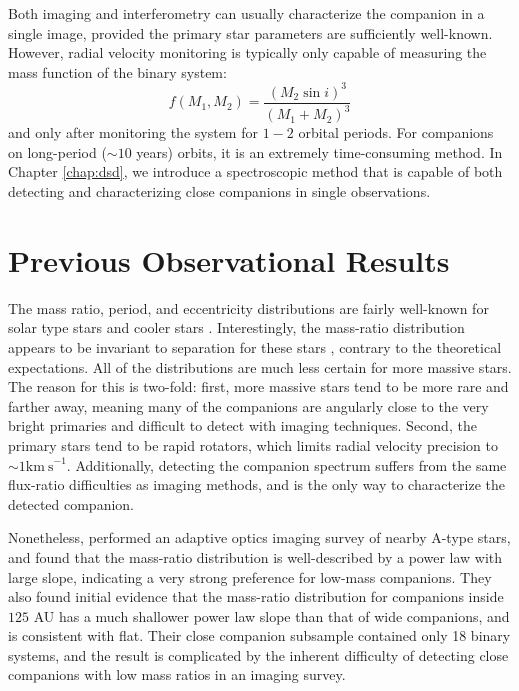 \documentclass{utthesis}
\begin{document}
Both imaging and interferometry can usually characterize the companion in a single image, provided the primary star parameters are sufficiently well-known. However, radial velocity monitoring is typically only capable of measuring the mass function of the binary system:
\begin{equation}
 f(M_1, M_2) = \frac{(M_2\sin{i})^3}{(M_1+M_2)^3}
 \end{equation}
 and only after monitoring the system for $1-2$ orbital periods. For companions on long-period ($\sim 10$ years) orbits, it is an extremely time-consuming method. In Chapter \ref{chap:dsd}, we introduce a spectroscopic method that is capable of both detecting and characterizing close companions in single observations.


\section{Previous Observational Results}

The mass ratio, period, and eccentricity distributions are fairly well-known for solar type stars \citep{Duquennoy1991, Raghavan2010} and cooler stars \citep{Fischer1992, Delfosse2004}. Interestingly, the mass-ratio distribution appears to be invariant to separation for these stars \citep{Meyer2013}, contrary to the theoretical expectations. All of the distributions are much less certain for more massive stars. The reason for this is two-fold: first, more massive stars tend to be more rare and farther away, meaning many of the companions are angularly close to the very bright primaries and difficult to detect with imaging techniques. Second, the primary stars tend to be rapid rotators, which limits radial velocity precision to $\sim 1 \mathrm{km\ s}^{-1}$. Additionally, detecting the companion spectrum suffers from the same flux-ratio difficulties as imaging methods, and is the only way to characterize the detected companion.

Nonetheless, \citet{DeRosa2014} performed an adaptive optics imaging survey of nearby A-type stars, and found that the mass-ratio distribution is well-described by a power law with large slope, indicating a very strong preference for low-mass companions. They also found initial evidence that the mass-ratio distribution for companions inside $125$ AU has a much shallower power law slope than that of wide companions, and is consistent with flat. Their close companion subsample contained only 18 binary systems, and the result is complicated by the inherent difficulty of detecting close companions with low mass ratios in an imaging survey. 
\end{document}
